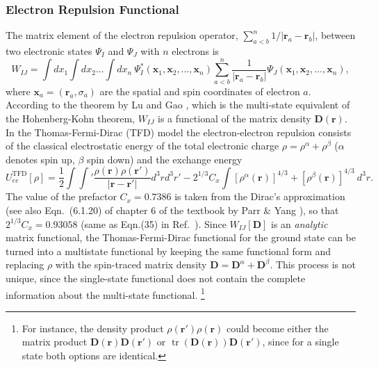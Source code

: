 \documentclass[journal=jpclcd,manuscript=letter]{achemso}
\DeclareMathOperator{\tr}{tr}
\newcommand\m[1]{\mathbf{#1}}
\renewcommand\vec[1]{\mathbf{#1}}
\begin{document}
\subsubsection{Electron Repulsion Functional}
The matrix element of the electron repulsion operator, $\sum_{a < b}^{n} 1/\vert \vec{r}_a - \vec{r}_b \vert$,
between two electronic states $\Psi_I$ and $\Psi_J$ with $n$ electrons is
\begin{equation}
 W_{IJ} = 
\int dx_1 \int dx_2 \ldots \int dx_{n} ~ \Psi_{I}^*(\vec{x}_1, \vec{x}_2, \ldots, \vec{x}_n)
\sum_{a < b}^{n} \frac{1}{\vert \vec{r}_a - \vec{r}_b \vert}
\Psi_{J}(\vec{x}_1, \vec{x}_2, \ldots, \vec{x}_n), \label{eqn:electron_repulsion_exact}
\end{equation}
where $\vec{x}_a = (\vec{r}_a, \sigma_a)$ are the spatial and spin coordinates of electron $a$.
According to the theorem by Lu and Gao \cite{Lu2022JPCL}, which is the multi-state equivalent of the Hohenberg-Kohn theorem,
$W_{IJ}$ is a functional of the matrix density $\m{D}(\vec{r})$.
In the Thomas-Fermi-Dirac (TFD) model \cite[chapter 6]{ParrYangBook} the electron-electron repulsion consists of the
classical electrostatic energy of the total electronic charge $\rho = \rho^{\alpha} + \rho^{\beta}$ ($\alpha$ denotes spin up, $\beta$ spin down) and the exchange energy 
\begin{equation}
U_{ee}^{\text{TFD}}[\rho] = \frac{1}{2} \int \int' \frac{\rho(\vec{r}) \rho(\vec{r}')}{\vert \vec{r}-\vec{r}' \vert} d^3r d^3r'
 - 2^{1/3} C_x \int [\rho^{\alpha}(\vec{r})]^{4/3} + [\rho^{\beta}(\vec{r})]^{4/3} ~ d^3r.
\end{equation}
The value of the prefactor $C_x = 0.7386$ is taken from the Dirac's approximation \cite{Dirac1930} (see also Eqn.~(6.1.20)
of chapter 6 of the textbook by Parr \& Yang \cite{ParrYangBook}), so that $2^{1/3} C_x = 0.93058$
(same as Eqn.(35) in Ref.~\cite{Perdew1981}).
Since $W_{IJ}[\m{D}]$ is an \emph{analytic} matrix functional,
the Thomas-Fermi-Dirac functional for the ground state can be turned into a multistate functional by keeping the same functional form
and replacing $\rho$ with the spin-traced matrix density $\m{D} = \m{D}^{\alpha} + \m{D}^{\beta}$. This process is not unique, since the single-state
functional does not contain the complete information about the multi-state functional.
\footnote{For instance, the density product $\rho(\vec{r}') \rho(\vec{r})$ could become
either the matrix product $\m{D}(\vec{r}) \m{D}(\vec{r}')$
or $\tr(\m{D}(\vec{r})) \m{D}(\vec{r}')$, since for a single state both options are identical.}
\end{document}
